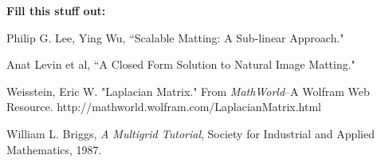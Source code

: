 \textbf{Fill this stuff out:}

\begin{thebibliography}{9}
	Philip G. Lee, Ying Wu,
	``Scalable Matting: A Sub-linear Approach."
	
	Anat Levin et al,
	``A Closed Form Solution to Natural Image Matting."
	
	 Weisstein, Eric W. "Laplacian Matrix." From 	\textit{MathWorld}--A Wolfram Web Resource. http://mathworld.wolfram.com/LaplacianMatrix.html 
	 
	William L. Briggs, \textit{A Multigrid Tutorial},
	Society for Industrial and Applied Mathematics, 1987.

\end{thebibliography}